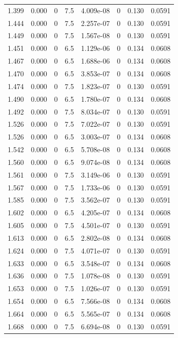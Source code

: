 \documentclass[preview]{standalone}
\begin{document}
{{{{{\begin{tabular}{L{1.2cm}C{1.2cm} C{0.3cm}C{0.5cm} C{1.4cm}C{1.4cm} C{1.4cm}C{1.4cm}}
  1.399  &  0.000  & 0     & 7.5 &  4.009e-08  & 0  & 0.130 &  0.0591   \\ 
  1.444  &  0.000  & 0     & 7.5 &  2.257e-07  & 0  & 0.130 &  0.0591   \\ 
  1.449  &  0.000  & 0     & 7.5 &  1.567e-08  & 0  & 0.130 &  0.0591   \\ 
  1.451  &  0.000  & 0     & 6.5 &  1.129e-06  & 0  & 0.134 &  0.0608   \\ 
  1.467  &  0.000  & 0     & 6.5 &  1.688e-06  & 0  & 0.134 &  0.0608   \\ 
  1.470  &  0.000  & 0     & 6.5 &  3.853e-07  & 0  & 0.134 &  0.0608   \\ 
  1.474  &  0.000  & 0     & 7.5 &  1.823e-07  & 0  & 0.130 &  0.0591   \\ 
  1.490  &  0.000  & 0     & 6.5 &  1.780e-07  & 0  & 0.134 &  0.0608   \\ 
  1.492  &  0.000  & 0     & 7.5 &  8.034e-07  & 0  & 0.130 &  0.0591   \\ 
  1.526  &  0.000  & 0     & 7.5 &  7.022e-07  & 0  & 0.130 &  0.0591   \\ 
  1.526  &  0.000  & 0     & 6.5 &  3.003e-07  & 0  & 0.134 &  0.0608   \\ 
  1.542  &  0.000  & 0     & 6.5 &  5.708e-08  & 0  & 0.134 &  0.0608   \\ 
  1.560  &  0.000  & 0     & 6.5 &  9.074e-08  & 0  & 0.134 &  0.0608   \\ 
  1.561  &  0.000  & 0     & 7.5 &  3.149e-06  & 0  & 0.130 &  0.0591   \\ 
  1.567  &  0.000  & 0     & 7.5 &  1.733e-06  & 0  & 0.130 &  0.0591   \\ 
  1.585  &  0.000  & 0     & 7.5 &  3.562e-07  & 0  & 0.130 &  0.0591   \\ 
  1.602  &  0.000  & 0     & 6.5 &  4.205e-07  & 0  & 0.134 &  0.0608   \\ 
  1.605  &  0.000  & 0     & 7.5 &  4.501e-07  & 0  & 0.130 &  0.0591   \\ 
  1.613  &  0.000  & 0     & 6.5 &  2.802e-08  & 0  & 0.134 &  0.0608   \\ 
  1.624  &  0.000  & 0     & 7.5 &  4.071e-07  & 0  & 0.130 &  0.0591   \\ 
  1.633  &  0.000  & 0     & 6.5 &  3.548e-07  & 0  & 0.134 &  0.0608   \\ 
  1.636  &  0.000  & 0     & 7.5 &  1.078e-08  & 0  & 0.130 &  0.0591   \\ 
  1.653  &  0.000  & 0     & 7.5 &  1.026e-07  & 0  & 0.130 &  0.0591   \\ 
  1.654  &  0.000  & 0     & 6.5 &  7.566e-08  & 0  & 0.134 &  0.0608   \\ 
  1.664  &  0.000  & 0     & 6.5 &  5.565e-07  & 0  & 0.134 &  0.0608   \\ 
  1.668  &  0.000  & 0     & 7.5 &  6.694e-08  & 0  & 0.130 &  0.0591   \\ 
\hline 
\end{tabular} 

}}}}}
\end{document}
